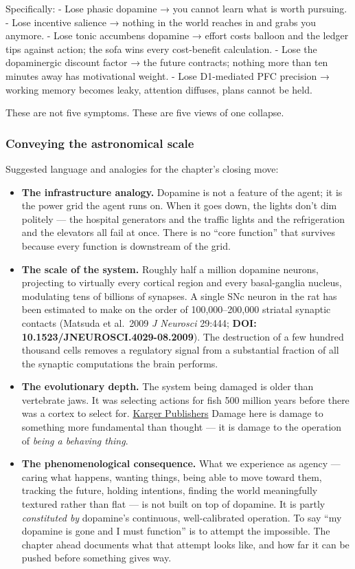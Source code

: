 Specifically: - Lose phasic dopamine → you cannot learn what is worth pursuing. - Lose incentive salience → nothing in the world reaches in and grabs you anymore. - Lose tonic accumbens dopamine → effort costs balloon and the ledger tips against action; the sofa wins every cost-benefit calculation. - Lose the dopaminergic discount factor → the future contracts; nothing more than ten minutes away has motivational weight. - Lose D1-mediated PFC precision → working memory becomes leaky, attention diffuses, plans cannot be held.

These are not five symptoms. These are five views of one collapse.

\subsubsection{Conveying the astronomical scale}\label{01_dopamine_substrate-conveying-the-astronomical-scale}

Suggested language and analogies for the chapter's closing move:

\begin{itemize}
\tightlist
\item
  \textbf{The infrastructure analogy.} Dopamine is not a feature of the agent; it is the power grid the agent runs on. When it goes down, the lights don't dim politely --- the hospital generators and the traffic lights and the refrigeration and the elevators all fail at once. There is no ``core function'' that survives because every function is downstream of the grid.
\item
  \textbf{The scale of the system.} Roughly half a million dopamine neurons, projecting to virtually every cortical region and every basal-ganglia nucleus, modulating tens of billions of synapses. A single SNc neuron in the rat has been estimated to make on the order of 100,000--200,000 striatal synaptic contacts (Matsuda et al.~2009 \emph{J Neurosci} 29:444; \textbf{DOI: 10.1523/JNEUROSCI.4029-08.2009}). The destruction of a few hundred thousand cells removes a regulatory signal from a substantial fraction of all the synaptic computations the brain performs.
\item
  \textbf{The evolutionary depth.} The system being damaged is older than vertebrate jaws. It was selecting actions for fish 500 million years before there was a cortex to select for. \href{https://karger.com/bbe/article/96/4-6/318/821601/The-Lamprey-Forebrain-Evolutionary-Implications}{Karger Publishers} Damage here is damage to something more fundamental than thought --- it is damage to the operation of \emph{being a behaving thing}.
\item
  \textbf{The phenomenological consequence.} What we experience as agency --- caring what happens, wanting things, being able to move toward them, tracking the future, holding intentions, finding the world meaningfully textured rather than flat --- is not built on top of dopamine. It is partly \emph{constituted by} dopamine's continuous, well-calibrated operation. To say ``my dopamine is gone and I must function'' is to attempt the impossible. The chapter ahead documents what that attempt looks like, and how far it can be pushed before something gives way.
\end{itemize}

